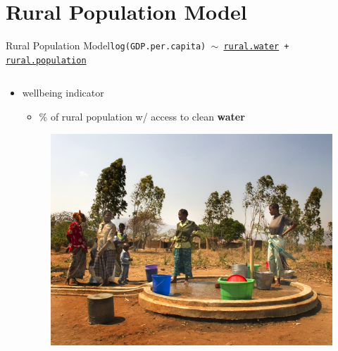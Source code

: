 \documentclass{beamer}
\begin{document}
\section{Rural Population Model}


\begin{frame}{{\sc Rural Population} Model}{\tt log(GDP.per.capita) $\sim$ \href{http://data.worldbank.org/indicator/SH.H2O.SAFE.RU.ZS}{rural.water} + \href{http://data.worldbank.org/indicator/SP.RUR.TOTL.ZS}{rural.population}}
  \begin{columns}
    \begin{column}{0.5\textwidth}
      \begin{itemize}
      \item wellbeing indicator
        \begin{itemize}
        \item \% of rural population w/ access to clean {\bf water}
        \end{itemize}
        \begin{figure}
	  \centering
	  \includegraphics[scale=0.12]{images/malawi_rural_water.jpg}
	\end{figure}
      \end{itemize}
    \end{column}
    

\end{columns}
\end{frame}
\end{document}
